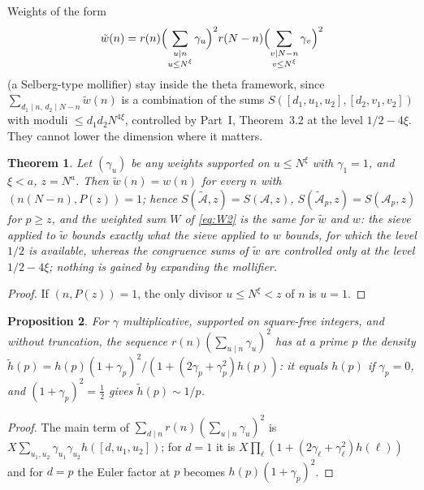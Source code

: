 ﻿\documentclass[11pt]{amsart}
\newtheorem{theorem}{Theorem}[section]
\newtheorem{proposition}[theorem]{Proposition}
\theoremstyle{remark}
\newcommand{\cA}{\mathcal{A}}
\begin{document}
Weights of the form
\begin{equation}\label{eq:moll}
\tilde w(n)=r(n)\Bigl(\sum_{\substack{u\mid n\\ u\le N^\xi}}\gamma_u\Bigr)^2r(N-n)\Bigl(\sum_{\substack{v\mid N-n\\ v\le N^\xi}}\gamma_v\Bigr)^2
\end{equation}
(a Selberg-type mollifier) stay inside the theta framework, since $\sum_{d_1\mid n,\,d_2\mid N-n}\tilde w(n)$ is a combination of the sums $S([d_1,u_1,u_2],[d_2,v_1,v_2])$ with moduli $\le d_1d_2N^{4\xi}$, controlled by Part~I, Theorem~3.2 at the level $1/2-4\xi$. They cannot lower the dimension where it matters.

\begin{theorem}\label{thm:nothing}
Let $(\gamma_u)$ be any weights supported on $u\le N^\xi$ with $\gamma_1=1$, and $\xi<a$, $z=N^a$. Then $\tilde w(n)=w(n)$ for every $n$ with $(n(N-n),P(z))=1$; hence $S(\tilde{\cA},z)=S(\cA,z)$, $S(\tilde{\cA}_p,z)=S(\cA_p,z)$ for $p\ge z$, and the weighted sum $W$ of \eqref{eq:W2} is the same for $\tilde w$ and $w$: the sieve applied to $\tilde w$ bounds exactly what the sieve applied to $w$ bounds, for which the level $1/2$ is available, whereas the congruence sums of $\tilde w$ are controlled only at the level $1/2-4\xi$; nothing is gained by expanding the mollifier.
\end{theorem}
\begin{proof}
If $(n,P(z))=1$, the only divisor $u\le N^\xi<z$ of $n$ is $u=1$.
\end{proof}

\begin{proposition}\label{prop:density}
For $\gamma$ multiplicative, supported on square-free integers, and without truncation, the sequence $r(n)(\sum_{u\mid n}\gamma_u)^2$ has at a prime $p$ the density $\tilde h(p)=h(p)(1+\gamma_p)^2/(1+(2\gamma_p+\gamma_p^2)h(p))$: it equals $h(p)$ if $\gamma_p=0$, and $(1+\gamma_p)^2=\frac12$ gives $\tilde h(p)\sim1/p$.
\end{proposition}
\begin{proof}
The main term of $\sum_{d\mid n}r(n)(\sum_{u\mid n}\gamma_u)^2$ is $X\sum_{u_1,u_2}\gamma_{u_1}\gamma_{u_2}h([d,u_1,u_2])$; for $d=1$ it is $X\prod_\ell(1+(2\gamma_\ell+\gamma_\ell^2)h(\ell))$ and for $d=p$ the Euler factor at $p$ becomes $h(p)(1+\gamma_p)^2$.
\end{proof}
\end{document}
